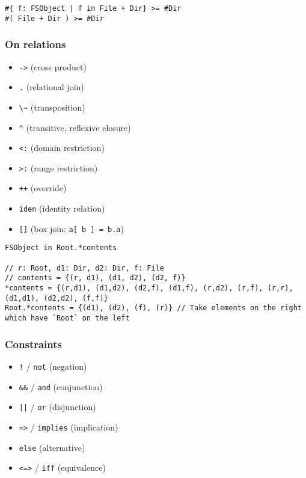 \documentclass[11pt]{article}
\begin{document}
\begin{verbatim}
#{ f: FSObject | f in File + Dir} >= #Dir
#( File + Dir ) >= #Dir
\end{verbatim}

\subsubsection{On relations}
\label{sec:org7dde16d}

\begin{itemize}
\item \texttt{->} (cross product)
\item \texttt{.} (relational join)
\item \texttt{\textbackslash{}\textasciitilde{}} (transposition)
\item \texttt{\textasciicircum{}} (transitive, reflexive closure)
\item \texttt{<:} (domain restriction)
\item \texttt{>:} (range restriction)
\item \texttt{++} (override)
\item \texttt{iden} (identity relation)
\item \texttt{[]} (box join: \texttt{a[ b ] = b.a})
\end{itemize}

\begin{verbatim}
FSObject in Root.*contents

// r: Root, d1: Dir, d2: Dir, f: File
// contents = {(r, d1), (d1, d2), (d2, f)}
*contents = {(r,d1), (d1,d2), (d2,f), (d1,f), (r,d2), (r,f), (r,r), (d1,d1), (d2,d2), (f,f)}
Root.*contents = {(d1), (d2), (f), (r)} // Take elements on the right which have `Root` on the left
\end{verbatim}

\subsubsection{Constraints}
\label{sec:orgc645aaa}

\begin{itemize}
\item \texttt{!} / \texttt{not} (negation)
\item \texttt{\&\&} / \texttt{and} (conjunction)
\item \texttt{||} / \texttt{or} (disjunction)
\item \texttt{=>} / \texttt{implies} (implication)
\item \texttt{else} (alternative)
\item \texttt{<=>} / \texttt{iff} (equivalence)
\end{itemize}
\end{document}
